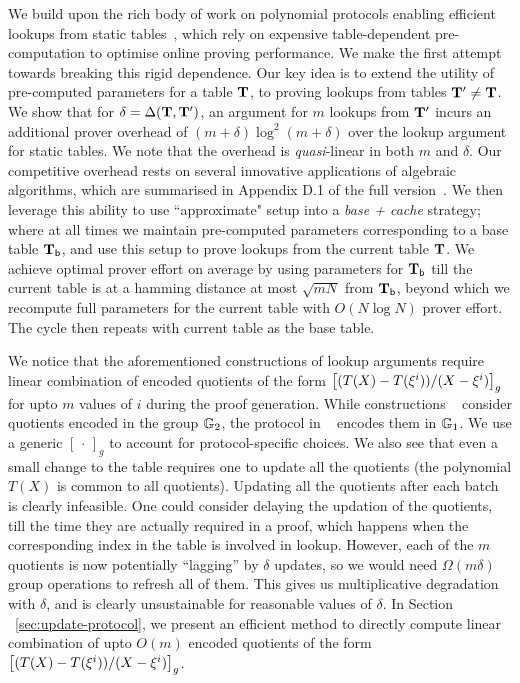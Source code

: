  We build upon the rich body of work on polynomial protocols enabling efficient lookups from static tables~\cite{CCS:ZBKMNS22,EPRINT:PosKat22,EPRINT:ZGKMR22,EPRINT:EagFioGab22}, which rely on expensive table-dependent pre-computation
to optimise online proving performance. We make the first attempt towards breaking this rigid dependence.
Our key idea is to extend the utility of pre-computed
parameters for a table $\mathbf{T}$, to proving lookups from tables $\mathbf{T}'\neq \mathbf{T}$.
We show that for $\delta=\Delta(\mathbf{T}, \mathbf{T}')$,
an argument for $m$ lookups from $\mathbf{T}'$ incurs an additional prover overhead of $(m+\delta)\log^2(m+\delta)$ over the
lookup argument for static tables. We note that the overhead is {\em quasi}-linear in both $m$ and $\delta$.
Our competitive overhead rests on several innovative applications of algebraic
algorithms, which are summarised in Appendix D.1 of the full version~\cite{full-ver}. We then leverage this ability to use ``approximate"
setup into a {\em base + cache} strategy; where at all times we maintain pre-computed parameters corresponding to
a base table $\mathbf{T}_{\mathsf{b}}$, and use this setup to prove lookups from the current table $\mathbf{T}$. We achieve optimal
prover effort on average by using parameters for $\mathbf{T}_{\mathsf{b}}$ till the current table is at a hamming distance
at most $\sqrt{mN}$ from $\mathbf{T}_{\mathsf{b}}$, beyond which we recompute full parameters for the current table with
$O(N\log N)$ prover effort. The cycle then repeats with current table as the base table.

\medskip

 We notice that the aforementioned constructions of lookup arguments require linear combination of
encoded quotients of the form $\left[{(T(X)-T(\xi^i))/(X-\xi^i)}\right]_g$ for upto $m$ values of $i$ during the proof generation.
While constructions ~\cite{CCS:ZBKMNS22,EPRINT:PosKat22}
consider quotients encoded in the group $\mathbb{G}_2$, the protocol in ~\cite{EPRINT:EagFioGab22} encodes them in $\mathbb{G}_1$.
We use a generic $[\,\cdot\,]_g$ to
account for protocol-specific choices. We also see that even a small change to the table requires one to update all the quotients (the polynomial $T(X)$ is
common to all quotients). Updating all the quotients after each batch is clearly infeasible. One could consider delaying the updation of the quotients, till
the time they are actually required in a proof, which happens when the corresponding index in the table is involved in lookup. However, each of the $m$ quotients
is now potentially ``lagging'' by $\delta$ updates, so we would need $\Omega(m\delta)$ group operations to refresh all of them. This gives us multiplicative degradation
with $\delta$, and is clearly unsustainable for reasonable values of $\delta$. In Section ~\ref{sec:update-protocol}, we present an efficient method
to directly compute linear combination of upto $O(m)$ encoded quotients of the form $\left[{(T(X)-T(\xi^i))/(X-\xi^i)}\right]_g$.

